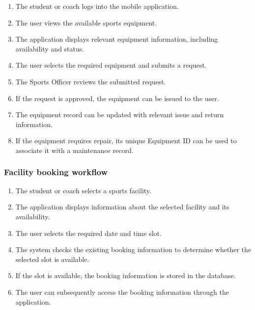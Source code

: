 \documentclass[11pt,a4paper]{article}
\begin{document}
\begin{enumerate}[leftmargin=0.7cm]

    \item The student or coach logs into the mobile application.

    \item The user views the available sports equipment.

    \item The application displays relevant equipment information,
    including availability and status.

    \item The user selects the required equipment and submits a request.

    \item The Sports Officer reviews the submitted request.

    \item If the request is approved, the equipment can be issued to the
    user.

    \item The equipment record can be updated with relevant issue and
    return information.

    \item If the equipment requires repair, its unique Equipment ID can
    be used to associate it with a maintenance record.

\end{enumerate}

\subsubsection*{Facility booking workflow}

\begin{enumerate}[leftmargin=0.7cm]

    \item The student or coach selects a sports facility.

    \item The application displays information about the selected
    facility and its availability.

    \item The user selects the required date and time slot.

    \item The system checks the existing booking information to
    determine whether the selected slot is available.

    \item If the slot is available, the booking information is stored
    in the database.

    \item The user can subsequently access the booking information
    through the application.

\end{enumerate}
\end{document}

